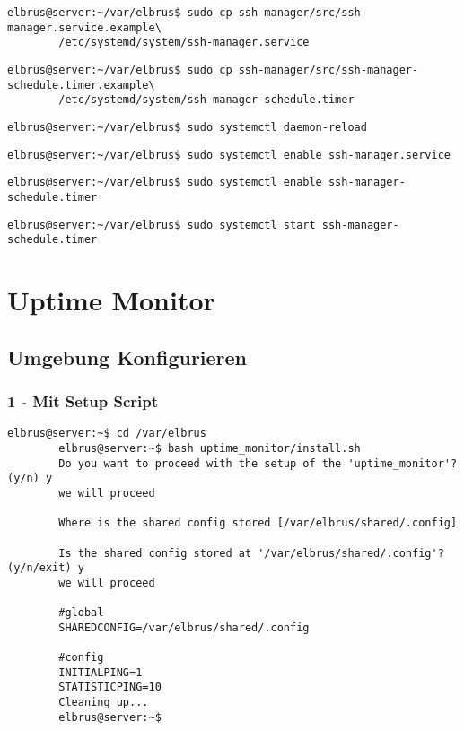 \documentclass{article}
\begin{document}
	\lstset{style=commands}
	\begin{lstlisting}[caption={Kopieren des Serviceprogrammes.}]
		elbrus@server:~/var/elbrus$ sudo cp ssh-manager/src/ssh-manager.service.example\
		/etc/systemd/system/ssh-manager.service
	\end{lstlisting}

	\begin{lstlisting}[caption={Kopieren des Zeitplanungsprogrammes.}]
		elbrus@server:~/var/elbrus$ sudo cp ssh-manager/src/ssh-manager-schedule.timer.example\
		/etc/systemd/system/ssh-manager-schedule.timer
	\end{lstlisting}

	\begin{lstlisting}[caption={Neuladen des 'systemctl' Deamons.}]
		elbrus@server:~/var/elbrus$ sudo systemctl daemon-reload
	\end{lstlisting}

	\begin{lstlisting}[caption={Aktivieren des Serviceprogrammes.}]
		elbrus@server:~/var/elbrus$ sudo systemctl enable ssh-manager.service
	\end{lstlisting}

	\begin{lstlisting}[caption={Aktivieren des Zeitplanungsprogrammes.}]
		elbrus@server:~/var/elbrus$ sudo systemctl enable ssh-manager-schedule.timer
	\end{lstlisting}

	\begin{lstlisting}[caption={Starten des Zeitplanungsprogrammes.}]
		elbrus@server:~/var/elbrus$ sudo systemctl start ssh-manager-schedule.timer
	\end{lstlisting}
	\newpage
	
	\section{Uptime Monitor}
	\subsection[file config]{Umgebung Konfigurieren}
	\lstset{style=files}
	\subsubsection{1 - Mit Setup Script}
	\lstset{style=commands}
	\begin{lstlisting}[caption={Ausführen des 'install.sh' Scripts.}]
		elbrus@server:~$ cd /var/elbrus
		elbrus@server:~$ bash uptime_monitor/install.sh
		Do you want to proceed with the setup of the 'uptime_monitor'? (y/n) y
		we will proceed
		
		Where is the shared config stored [/var/elbrus/shared/.config]
		
		Is the shared config stored at '/var/elbrus/shared/.config'? (y/n/exit) y
		we will proceed
		
		#global
		SHAREDCONFIG=/var/elbrus/shared/.config
		
		#config
		INITIALPING=1
		STATISTICPING=10
		Cleaning up...
		elbrus@server:~$
	\end{lstlisting}
\end{document}
